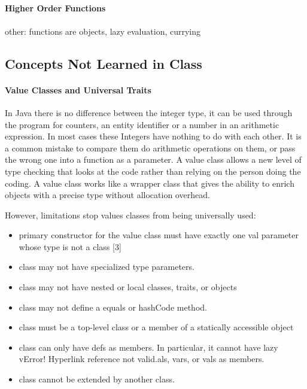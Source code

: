 \documentclass[12pt]{article}
\begin{document}
		\paragraph{Higher Order Functions}
		\paragraph{} other: functions are objects, lazy evaluation, currying
	\subsection{Concepts Not Learned in Class}
		\paragraph{Value Classes and Universal Traits} In Java there is no difference between the integer type, it can be used through the program for counters, an entity identifier or a number in an arithmetic expression. In most cases these Integers have nothing to do with each other. It is a common mistake to compare them do arithmetic operations on them, or pass the wrong one into a function as a parameter. A value class allows a new level of type checking that looks at the code rather than relying on the person doing the coding. A value class works like a wrapper class that gives the ability to enrich objects with a precise type without allocation overhead. 

However, limitations stop values classes from being universally used:

		\begin{itemize}
			\item primary constructor for the value class must have exactly one val parameter whose type is not a class [3]
			\item class may not have specialized type parameters.
			\item class may not have nested or local classes, traits, or objects
			\item class may not define a equals or hashCode method.
			\item class must be a top-level class or a member of a statically accessible object
			\item class can only have defs as members. In particular, it cannot have lazy vError! Hyperlink reference not valid.als, vars, or vals as members.
			\item class cannot be extended by another class.
		\end{itemize}
\end{document}
